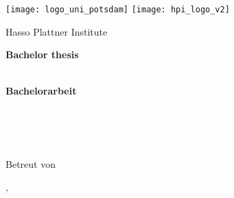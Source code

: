 \begin{titlepage}

\centering

\texttt{[image: logo\_uni\_potsdam]}
\hspace{2.5cm}
\texttt{[image: hpi\_logo\_v2]}
\vspace*{0.75cm}

\textsf{\Large Hasso Plattner Institute}\\

\vspace{2cm}

\Large
\textbf{Bachelor thesis}\\[0.5\baselineskip]
\LARGE
\textbf{\docTitle}\\[0.5\baselineskip]

\vspace{2cm}

\Large
\textbf{Bachelorarbeit}\\[0.5\baselineskip]
\LARGE
\textbf{\docTitleDE}\\[0.5\baselineskip]

\vspace{2cm}

\Large
\docAuthor\\[0.5\baselineskip]
{\normalsize \docAuthorMail}\\

\vfill

\large
Betreut von \docSupervisited
\\[1.0\baselineskip]
\docChair

\vspace{1cm}
\textsf{\docCity{}, \docDate}\\ %
\end{titlepage}
